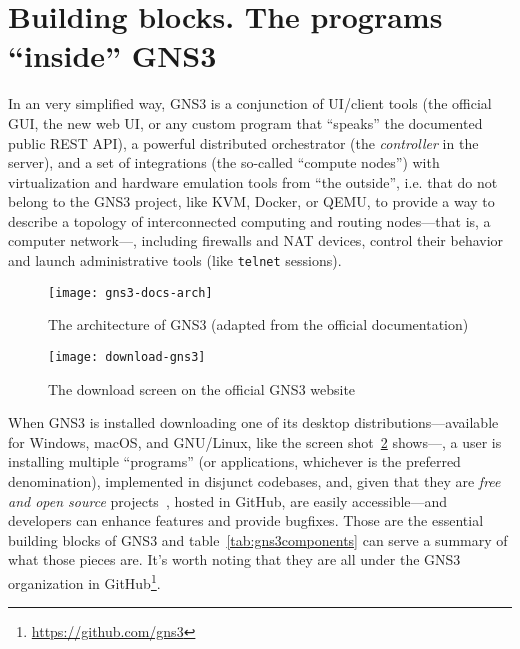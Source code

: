 \section{Building blocks. The programs ``inside'' GNS3}
\label{sec:gns3buildingblocks}

In an very simplified way, GNS3 is a conjunction of UI/client tools (the official GUI, the new web UI, or any custom program that ``speaks'' the documented public \acrshort{REST} API), a powerful distributed orchestrator (the \emph{controller} in the server), and a set of integrations (the so-called ``compute nodes'') with virtualization and hardware emulation tools from ``the outside'', i.e. that do not belong to the GNS3 project, like KVM, Docker, or QEMU, to provide a way to describe a topology of interconnected computing and routing nodes---that is, a computer network---, including firewalls and NAT devices, control their behavior and launch administrative tools (like \texttt{telnet} sessions). %

\begin{figure}
  \centering
  \texttt{[image: gns3-docs-arch]}
  \caption{The architecture of GNS3 (adapted from the official documentation)}
  \label{fig:gns3-docs-arch}
\end{figure}


\begin{figure}
  \centering
  \texttt{[image: download-gns3]}
  \caption{The download screen on the official GNS3 website}
  \label{fig:download-gns3}
\end{figure}

When GNS3 is installed downloading one of its desktop distributions---available for Windows, macOS, and GNU/Linux, like the screen shot~\ref{fig:download-gns3} shows---, a user is installing multiple ``programs'' (or applications, whichever is the preferred denomination), implemented in disjunct codebases, and, given that they are \emph{free and open source} projects~\cite{gplv3}, hosted in GitHub, are easily accessible---and developers can enhance features and provide bugfixes.
Those are the essential building blocks of GNS3 and table~\ref{tab:gns3components} can serve a summary of what those pieces are.
It's worth noting that they are all under the GNS3 organization in GitHub\footnote{\url{https://github.com/gns3}}.

